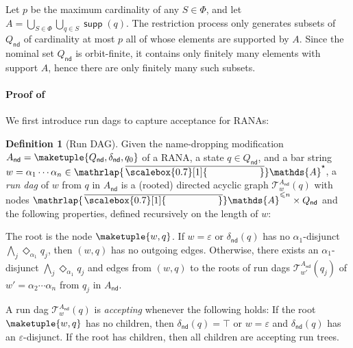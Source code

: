 \documentclass[10pt,a4paper]{amsart}
\theoremstyle{definition}
\newtheorem{defn}[theo]{Definition}
\newcommand{\At}{\mathds{A}}
\newcommand{\barAs}{\barNames^{\star}}
\newcommand{\op}[1]{\operatorname{\mathsf{#1}}}
\newcommand{\nd}{\op{nd}}
\newcommand{\runtree}[3]{\mathcal{T}_{#1}^{#2}(#3)}
\DeclareMathOperator{\supp}{\mathsf{supp}}
\newcommand{\names}{\At}
\newcommand{\mybar}[3]{%
  \mathrlap{\hspace{#2}\overline{\scalebox{#1}[1]{\phantom{\ensuremath{#3}}}}}\ensuremath{#3}
}
\newcommand{\barNames}{{\mybar{0.7}{1.25pt}{\names}}}
\begin{document}
\begin{IEEEproof}
Let $p$ be the maximum cardinality of any $S\in \Phi$, and let $A=\bigcup_{S\in \Phi}\bigcup_{q\in S} \supp(q)$. The restriction process only generates subsets of $Q_{\nd}$ of cardinality at most $p$ all of whose elements are supported by $A$. Since the nominal set $Q_{\nd}$ is orbit-finite, it contains only finitely many elements with support $A$, hence there are only finitely many such subsets.  
\end{IEEEproof}

\paragraph*{Proof of~} We first introduce run dags to capture acceptance for RANAs:

\begin{defn}[Run DAG]
  Given the name-dropping modification $A_{\nd} = \maketuple{Q_{\nd}, \delta_{\nd}, q_0}$ of a RANA,
  a state $q \in Q_{\nd}$, and a bar string $w = \alpha_1 \cdots \alpha_n \in \barAs$, a
  \emph{run dag} of $w$ from $q$ in $A_{\nd}$ is a (rooted) directed acyclic graph $\runtree{w}{A_{\nd}}{q}$ with nodes  $\barNames^{\leqslant n} \times Q_{\nd}$ and the following properties,
  defined recursively on the length of $w$:
 
The root is the node
  $\maketuple{w, q}$. If $w = \varepsilon$
  or $\delta_{\nd}(q)$ has no $\alpha_1$-disjunct $\bigwedge_{j} \Diamond_{\alpha_1} q_j$,
  then $(w,q)$ has no outgoing edges.
  Otherwise, there exists an
  $\alpha_1$-disjunct $\bigwedge_{j} \Diamond_{\alpha_1} q_j$ and edges from $(w,q)$ to the roots of run dags $\runtree{w'}{A_{\nd}}{q_j}$ of $w' = \alpha_2 \cdots \alpha_n$ from $q_j$ in $A_{\nd}$.%

A run dag $\runtree{w}{A_{\nd}}{q}$ is \emph{accepting} whenever the following holds: If the root $\maketuple{w, q}$ has no children, then $\delta_{\nd}(q)=\top$ or
  $w = \varepsilon$ and $\delta_{\nd}(q)$ has an $\varepsilon$-disjunct. If the root has children, then all children are accepting run trees.
\end{defn}
\end{document}
